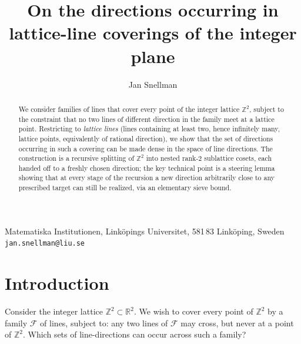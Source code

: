 \documentclass[a4paper,11pt,oneside,reqno]{amsart}
\theoremstyle{definition}
\theoremstyle{remark}
\theoremstyle{plain}
\newcommand{\Z}{\mathbb{Z}}
\newcommand{\R}{\mathbb{R}}
\begin{document}
\title[Lattice-line directions]{On the directions occurring in lattice-line coverings of the integer plane}
\author{Jan Snellman }
\address{Matematiska Institutionen, Linköpings Universitet, 581 83 Linköping, Sweden}
\makeatletter
\let\addresses\@empty
\makeatother
\maketitle

\begin{center}
  \small
  Matematiska Institutionen, Linköpings Universitet, 581\,83 Linköping, Sweden\\
  \texttt{jan.snellman@liu.se}
\end{center}

\begin{abstract}
  We consider families of lines that cover every point of the integer lattice \(\Z^2\), subject to
  the constraint that no two lines of different direction in the family meet at a lattice point.
  Restricting to \emph{lattice lines} (lines containing at least two, hence infinitely many,
  lattice points, equivalently of rational direction), we show that the set of directions
  occurring in such a covering can be made dense in the space of line directions. The construction
  is a recursive splitting of \(\Z^2\) into nested rank-2 sublattice cosets, each handed off to a
  freshly chosen direction; the key technical point is a steering lemma showing that at every
  stage of the recursion a new direction arbitrarily close to any prescribed target can still be
  realized, via an elementary sieve bound.
\end{abstract}

\section{Introduction}

Consider the integer lattice \(\Z^2\subset\R^2\). We wish to cover every point of \(\Z^2\) by a family
\(\mathcal F\) of lines, subject to: any two lines of \(\mathcal F\) may cross, but never at a point of
\(\Z^2\). Which sets of line-directions can occur across such a family?
\end{document}
